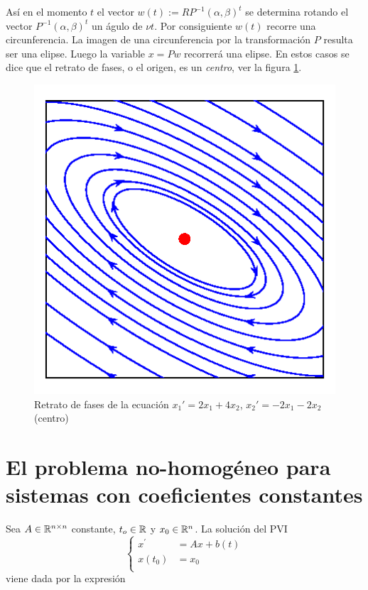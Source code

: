\begin{ejemplo}{}
Así en el momento $t$ el vector $w(t):=RP^{-1}(\alpha,\beta)^t$ se determina rotando el vector  $P^{-1}(\alpha,\beta)^t$ un águlo de $\nu t$. Por consiguiente $w(t)$ recorre una circunferencia. La imagen de una circunferencia por la transformación $P$ resulta ser una elipse. Luego la variable $x=Pw$ recorrerá una elipse. En estos casos se dice que el retrato de fases, o el origen, es un \emph{centro}, ver la figura \ref{fig:centro}.


\begin{figure}[h]
\begin{center}
\includegraphics[scale=.5]{imagenes/centro.png}
\end{center}
\caption{Retrato de fases de la ecuación $x_1'=2x_1+4x_2$,
$x_2'=-2x_1-2x_2$ (centro)}\label{fig:centro}
\end{figure}



\end{ejemplo}



\section{El problema no-homogéneo para sistemas con coeficientes constantes}

\begin{corolario}{} Sea $A\in \mathbb{R}^{n\times n}$ constante, $t_o\in\mathbb{R}$ y $x_0\in\mathbb{R}^n$. La solución del PVI
\[
 \left\{
    \begin{array}{ll}
        x^{\prime}&=A x+b(t)\\
        x(t_0)&=x_0\\
    \end{array}
  \right.
\]
viene dada por la expresión
\end{corolario}

